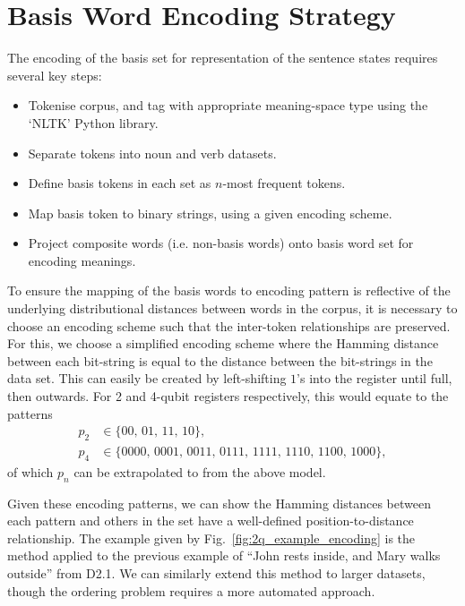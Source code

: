 \section{Basis Word Encoding Strategy}\label{sec:basis_words}

The encoding of the basis set for representation of the sentence states requires several key steps:
\begin{itemize}
    \item Tokenise corpus, and tag with appropriate meaning-space type using the `NLTK' Python library.
    \item Separate tokens into noun and verb datasets.
    \item Define basis tokens in each set as $n$-most frequent tokens.
    \item Map basis token to binary strings, using a given encoding scheme.
    \item Project composite words (i.e. non-basis words) onto basis word set for encoding meanings.
\end{itemize}

To ensure the mapping of the basis words to encoding pattern is reflective of the underlying distributional distances between words in the corpus, it is necessary to choose an encoding scheme such that the inter-token relationships are preserved. For this, we choose a simplified encoding scheme where the Hamming distance between each bit-string is equal to the distance between the bit-strings in the data set. This can easily be created by left-shifting $1$'s into the register until full, then outwards. For 2 and 4-qubit registers respectively, this would equate to the patterns
\begin{align*}
    p_2 &\in \{00,\, 01,\, 11,\, 10\}, \\
    p_4 &\in \{0000,\, 0001,\, 0011,\, 0111,\, 1111,\, 1110,\, 1100,\, 1000 \},
\end{align*}
of which $p_n$ can be extrapolated to from the above model.

Given these encoding patterns, we can show the Hamming distances between each pattern and others in the set have a well-defined position-to-distance relationship. The example given by Fig.~\ref{fig:2q_example_encoding} is the method applied to the previous example of ``John rests inside, and Mary walks outside'' from D2.1. We can similarly extend this method to larger datasets, though the ordering problem requires a more automated approach.

